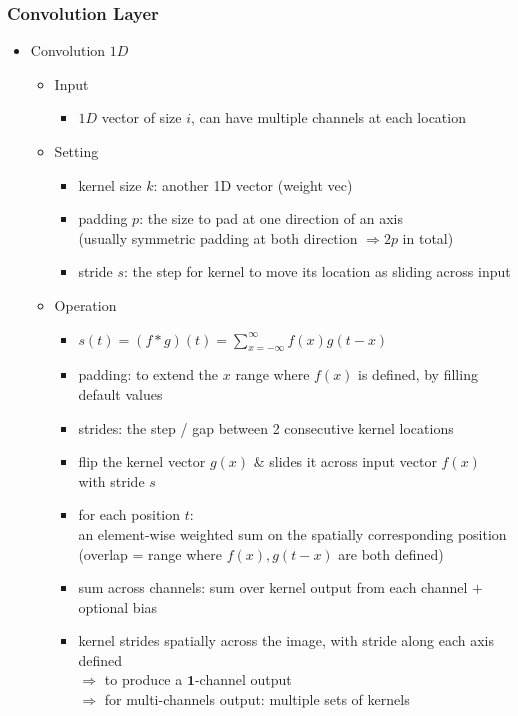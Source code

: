 \subsubsection{Convolution Layer}
\begin{itemize}
\item Convolution $1D$
	\begin{itemize}
	\item Input
		\begin{itemize}
		\item $1D$ vector of size $i$, can have multiple channels at each location
		\end{itemize}
	\item Setting
		\begin{itemize}
		\item kernel size $k$: another 1D vector (weight vec)
		\item padding $p$: the size to pad at one direction of an axis \\
		(usually symmetric padding at both direction $\Rightarrow2p$ in total)
		\item stride $s$: the step for kernel to move its location as sliding across input
		\end{itemize}
	\item Operation
		\begin{itemize}
		\item $\displaystyle s(t) = (f * g)(t) = \sum_{x=-\infty}^\infty f(x)g(t-x)$
		\item padding: to extend the $x$ range where $f(x)$ is defined, by filling default values
		\item strides: the step / gap between 2 consecutive kernel locations
		\item flip the kernel vector $g(x)$ \& slides it across input vector $f(x)$ with stride $s$
		\item for each position $t$: \\
		an element-wise weighted sum on the spatially corresponding position \\
		(overlap = range where $f(x), g(t-x)$ are both defined)
		\item sum across channels: sum over kernel output from each channel $+$ optional bias
		\item kernel strides spatially across the image, with stride along each axis defined \\
		$\Rightarrow$ to produce a $\mathbf 1$-channel output \\
		$\Rightarrow$ for multi-channels output: multiple sets of kernels

\end{itemize}
\end{itemize}
\end{itemize}
